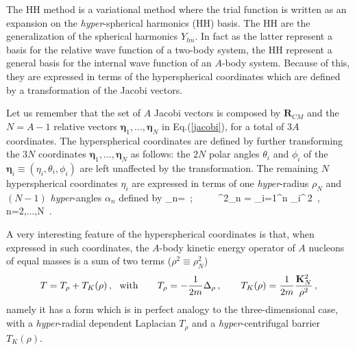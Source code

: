 The HH method is a variational method where the trial function is written as
an expansion on the {\it hyper}-spherical harmonics (HH) basis. 
The HH are the generalization of the
spherical harmonics $Y_{lm}$. In fact as the latter represent a basis for the relative wave function of a two-body system,
the HH represent a general basis for the internal wave function of an $A$-body system.
Because of this,  they   are expressed in terms of the hyperspherical coordinates which are defined by a transformation 
of the Jacobi vectors.

Let us remember that the set of $A$ Jacobi vectors is composed 
by  $\mathbf{R}_{CM}$ and the $N=A-1$ relative vectors $\mathbf{\eta}_1,...,\mathbf{\eta}_N$ in Eq.(\ref{jacobi}), for a total of $3 A$ coordinates. 
The hyperspherical coordinates are defined by further transforming  
the $3N$ coordinates $\mathbf{\eta}_1,...,\mathbf{\eta}_N$ as follows:
the $2N$ polar angles $\theta_i$ and $\phi_i$ of the $\mathbf{\eta}_i\equiv(\eta_i,\theta_i,\phi_i)$ are left unaffected 
by the transformation. The remaining 
$N$  hyperspherical coordinates $\eta_i$ are expressed in terms of one {\it hyper}-radius $\rho_N$ and $(N-1)$ 
{\it hyper}-angles $\alpha_n$ defined by
\be
\sin\alpha_n= {} \,; \,\,\,\,\,\,\,\,\,\,\,\,\,\,\rho^2_n  = \sum_{i=1}^n \eta_i^{\,2}
 \,, \,\,\, n=2,...,N \,.
\ee

A very interesting feature of the hyperspherical coordinates is that, when expressed in such coordinates,
the $A$-body kinetic energy operator of $A$ nucleons of equal masses is a sum of two terms ($\rho^2 \equiv \rho^2_N$)
~\cite{HiD56}
 \begin{equation}\label{Trho}
  T =  T_\rho + T_K(\rho)\,,\,\,\,\, {\rm with} \qquad T_\rho= - \frac{1}{2m}\Delta_{\rho} \,, \qquad 
T_K(\rho)=\frac{1}{2 m} \frac{{\bf K}_N^2}{\rho^2}\,,
\end{equation} 
namely it has a form which is  in perfect analogy to the three-dimensional case, 
with a {\it hyper}-radial dependent Laplacian $T_\rho$ and a {\it hyper}-centrifugal barrier $T_K(\rho)$.


